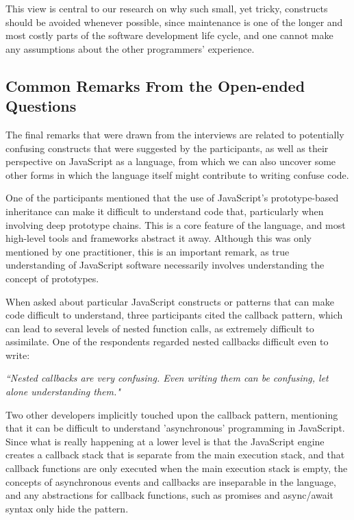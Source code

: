 This view is central to our research on why such small, yet tricky, constructs should be avoided whenever possible, since maintenance is one of the longer and most costly parts of the software development life cycle, and one cannot make any assumptions about the other programmers' experience.



\subsection{Common Remarks From the Open-ended Questions} The final remarks that were drawn from the interviews are related to potentially confusing constructs that were suggested by the participants, as well as their perspective on JavaScript as a language, from which we can also uncover some other forms in which the language itself might contribute to writing confuse code.

One of the participants mentioned that the use of JavaScript's prototype-based inheritance can make it difficult to understand code that, particularly when involving  deep prototype chains. This is a core feature of the language, and most high-level tools and frameworks abstract it away. Although this was only mentioned by one practitioner, this is an important remark, as true understanding of JavaScript software necessarily involves understanding the concept of prototypes.

When asked about particular JavaScript constructs or patterns that can make code difficult to understand, three participants cited the callback pattern, which can lead to several levels of nested function calls, as extremely difficult to assimilate. One of the respondents regarded nested callbacks difficult even to write:

\begin{mq}
\emph{``Nested callbacks are very confusing. Even writing them can be confusing, let alone understanding them."}
\end{mq}

Two other developers implicitly touched upon the callback pattern, mentioning that it can be difficult to understand 'asynchronous' programming in JavaScript. Since what is really happening at a lower level is that the JavaScript engine creates a callback stack that is separate from the main execution stack, and that callback functions are only executed when the main execution stack is empty, the concepts of asynchronous events and callbacks are inseparable in the language, and any abstractions for callback functions, such as promises and async/await syntax only hide the pattern.

